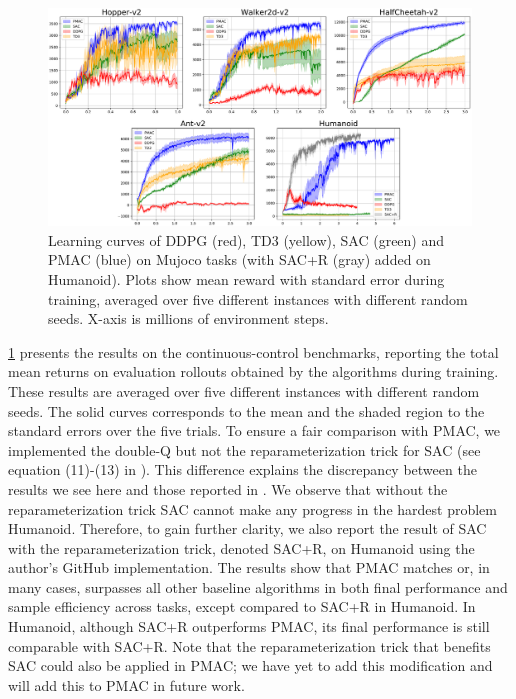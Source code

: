 \begin{figure}[t]
\centering
\includegraphics[width=0.8\linewidth]{./mujoco-results.pdf} \vspace{-0.3cm} 
\caption{
Learning curves of DDPG (red), TD3 (yellow), SAC (green) and PMAC (blue) on
Mujoco tasks (with SAC+R (gray) added on Humanoid).
Plots show mean reward with standard error during training,
averaged over five different instances with different random seeds.
X-axis is millions of environment steps.
}
\label{fig:result-mujoco}
\vspace{-0.2cm} 
\end{figure}

\cref{fig:result-mujoco} presents the results on the 
continuous-control benchmarks, reporting the total mean returns
on evaluation rollouts obtained by the algorithms during training.
These
results are averaged over five different instances
with different random seeds.
The solid curves corresponds to the mean and the shaded region to the
standard errors over the five trials.
To ensure a fair comparison with PMAC, we implemented the double-Q
but not the reparameterization trick for SAC 
(see equation (11)-(13) in \citep{haarnoja2018soft}).
This difference explains the discrepancy between the results we see here
and those reported in \citep{haarnoja2018soft}.
We observe that without the reparameterization trick SAC cannot make
any progress in the hardest problem Humanoid.
Therefore, to gain further clarity, 
we also report the result of SAC with the reparameterization trick,
denoted SAC+R,
on Humanoid using the author's GitHub implementation.
The results show that PMAC matches or, in many cases, surpasses all other
baseline algorithms in both final performance and sample efficiency across
tasks, except compared to SAC+R in Humanoid.
In Humanoid, although SAC+R outperforms PMAC,
its final performance is still comparable with SAC+R.
Note that the reparameterization trick that benefits SAC
could also be applied in PMAC;
we have yet to add this modification and
will add this to PMAC in future work.


